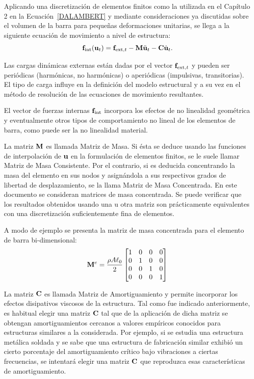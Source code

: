 Aplicando una discretización de elementos finitos como la utilizada en el Capítulo 2 en la Ecuación~\eqref{DALAMBERT} y mediante consideraciones ya discutidas sobre el volumen de la barra para pequeñas deformaciones unitarias, se llega a la siguiente ecuación de movimiento a nivel de estructura:
%
\begin{equation}\label{EcMovNL}
	{\bf f}_{\text{int}}({\bf u}_t) = {\bf f}_{\text{ext},t} - {\bf M} \ddot{{\bf u}}_t - {\bf C} \dot{{\bf u}}_t.
\end{equation}

Las cargas dinámicas externas están dadas por el vector ${\bf f}_{\text{ext},t}$ y pueden ser periódicas (harmónicas, no harmónicas) o aperiódicas (impulsivas, transitorias). %
%
El tipo de carga influye en la definición del modelo estructural y a su vez en el método de resolución de las ecuaciones de movimiento resultantes.

El vector de fuerzas internas ${\bf f}_{\text{int}}$ incorpora los efectos de no linealidad geométrica y eventualmente otros tipos de comportamiento no lineal de los elementos de barra, como puede ser la no linealidad material.

La matriz ${\bf M}$ es llamada Matriz de Masa. %
%
Si ésta se deduce usando las funciones de interpolación de ${\bf u}$ en la formulación de elementos finitos, se le suele llamar Matriz de Masa Consistente. Por el contrario, si es deducida concentrando la masa del elemento en sus nodos y asignándola a sus respectivos grados de libertad de desplazamiento, se la llama Matriz de Masa Concentrada. %
%
En este documento se consideran matrices de masa concentrada. %
%
Se puede verificar que los resultados obtenidos usando una u otra matriz son prácticamente equivalentes con una discretización suficientemente fina de elementos.

A modo de ejemplo se presenta la matriz de masa concentrada para el elemento de barra bi-dimensional:
%
\begin{equation}
{\bf M}^e = \frac{\rho A \ell_0}{2}
\left[\begin{matrix}
1 & 0 & 0 & 0\\
0 & 1 &0 & 0\\
0 & 0& 1 & 0\\
0 & 0 &0 & 1\\
\end{matrix}
\right]
\end{equation}

La matriz ${\bf C}$ es llamada Matriz de Amortiguamiento y permite incorporar los efectos disipativos viscosos de la estructura. %
%
Tal como fue indicado anteriormente, es habitual elegir una matriz ${\bf C}$ tal que de la aplicación de dicha matriz se obtengan amortiguamientos cercanos a valores empíricos conocidos para estructuras similares a la considerada. %
%
Por ejemplo, si se estudia una estructura metálica soldada y se sabe que una estructura de fabricación similar exhibió un cierto porcentaje del amortiguamiento crítico bajo vibraciones a ciertas frecuencias, se intentará elegir una matriz ${\bf C}$ que reproduzca esas características de amortiguamiento.

